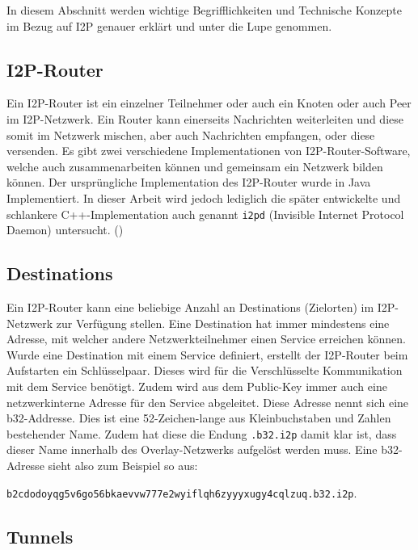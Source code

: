 In diesem Abschnitt werden wichtige Begrifflichkeiten und Technische Konzepte im Bezug auf I2P genauer erklärt und unter die Lupe genommen.

\subsection{I2P-Router}\label{sec:router}

Ein I2P-Router ist ein einzelner Teilnehmer oder auch ein Knoten oder auch Peer im I2P-Netzwerk.
Ein Router kann einerseits Nachrichten weiterleiten und diese somit im Netzwerk mischen, aber auch Nachrichten empfangen, oder diese versenden.
Es gibt zwei verschiedene Implementationen von I2P-Router-Software, welche auch zusammenarbeiten können und gemeinsam ein Netzwerk bilden können.
Der ursprüngliche Implementation des I2P-Router wurde in Java Implementiert.
In dieser Arbeit wird jedoch lediglich die später entwickelte und schlankere C++-Implementation auch genannt \lstinline|i2pd| (Invisible Internet Protocol Daemon) untersucht. (\cite{noauthor_i})

\subsection{Destinations}

Ein I2P-Router kann eine beliebige Anzahl an Destinations (Zielorten) im I2P-Netzwerk zur Verfügung stellen.
Eine Destination hat immer mindestens eine Adresse, mit welcher andere Netzwerkteilnehmer einen Service erreichen können.
Wurde eine Destination mit einem Service definiert, erstellt der I2P-Router beim Aufstarten ein Schlüsselpaar.
Dieses wird für die Verschlüsselte Kommunikation mit dem Service benötigt.
Zudem wird aus dem Public-Key immer auch eine netzwerkinterne Adresse für den Service abgeleitet.
Diese Adresse nennt sich eine b32-Addresse.
Dies ist eine 52-Zeichen-lange aus Kleinbuchstaben und Zahlen bestehender Name.
Zudem hat diese die Endung \lstinline|.b32.i2p| damit klar ist, dass dieser Name innerhalb des Overlay-Netzwerks aufgelöst werden muss.
Eine b32-Adresse sieht also zum Beispiel so aus:

\lstinline|b2cdodoyqg5v6go56bkaevvw777e2wyiflqh6zyyyxugy4cqlzuq.b32.i2p|.

\parencite{noauthor_naming_nodate}

\subsection{Tunnels}

